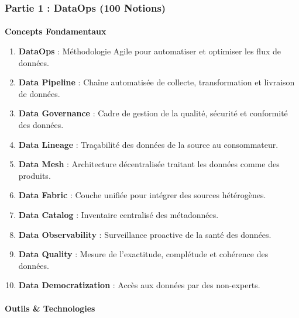 \documentclass[
  letterpaper,
  DIV=11,
  numbers=noendperiod]{scrartcl}
\makeatletter
\let\oldparagraph\paragraph
\renewcommand{\paragraph}{
    \@ifstar
      \xxxParagraphStar
      \xxxParagraphNoStar
  }
\newcommand{\xxxParagraphStar}[1]{\oldparagraph*{#1}\mbox{}}
\newcommand{\xxxParagraphNoStar}[1]{\oldparagraph{#1}\mbox{}}
\providecommand{\tightlist}{%
  \setlength{\itemsep}{0pt}\setlength{\parskip}{0pt}}\usepackage{longtable,booktabs,array}
\makeatother
\begin{document}
\subsubsection{\texorpdfstring{\textbf{Partie 1 : DataOps (100
Notions)}}{Partie 1 : DataOps (100 Notions)}}\label{partie-1-dataops-100-notions}

\paragraph{\texorpdfstring{\textbf{Concepts
Fondamentaux}}{Concepts Fondamentaux}}\label{concepts-fondamentaux-1}

\begin{enumerate}
\def\labelenumi{\arabic{enumi}.}
\tightlist
\item
  \textbf{DataOps} : Méthodologie Agile pour automatiser et optimiser
  les flux de données.\\
\item
  \textbf{Data Pipeline} : Chaîne automatisée de collecte,
  transformation et livraison de données.\\
\item
  \textbf{Data Governance} : Cadre de gestion de la qualité, sécurité et
  conformité des données.\\
\item
  \textbf{Data Lineage} : Traçabilité des données de la source au
  consommateur.\\
\item
  \textbf{Data Mesh} : Architecture décentralisée traitant les données
  comme des produits.\\
\item
  \textbf{Data Fabric} : Couche unifiée pour intégrer des sources
  hétérogènes.\\
\item
  \textbf{Data Catalog} : Inventaire centralisé des métadonnées.\\
\item
  \textbf{Data Observability} : Surveillance proactive de la santé des
  données.\\
\item
  \textbf{Data Quality} : Mesure de l'exactitude, complétude et
  cohérence des données.\\
\item
  \textbf{Data Democratization} : Accès aux données par des non-experts.
\end{enumerate}

\paragraph{\texorpdfstring{\textbf{Outils \&
Technologies}}{Outils \& Technologies}}\label{outils-technologies-1}
\end{document}
